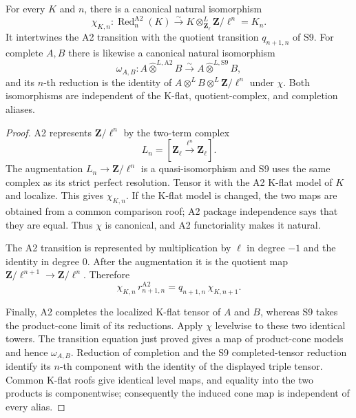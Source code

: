 \begin{lemma}
\label{lemma:weil-pbc-a2-reduction-tensor-transport}
For every $K$ and $n$, there is a canonical natural isomorphism
\[
 \chi_{K,n}:\operatorname{Red}^{\mathrm{A2}}_n(K)
 \xrightarrow{\sim}K\otimes^L_{\mathbf Z_\ell}\mathbf Z/\ell^n=K_n.
\]
It intertwines the A2 transition with the quotient transition
$q_{n+1,n}$ of S9.  For complete $A,B$ there is likewise a canonical natural
isomorphism
\[
 \omega_{A,B}:
 A\widehat\otimes^{L,\mathrm{A2}}B
 \xrightarrow{\sim}
 A\widehat\otimes^{L,\mathrm{S9}}B,
\]
and its $n$-th reduction is the identity of
$A\otimes^LB\otimes^L\mathbf Z/\ell^n$ under $\chi$.  Both isomorphisms are
independent of the K-flat, quotient-complex, and completion aliases.
\end{lemma}
\begin{proof}

A2 represents $\mathbf Z/\ell^n$ by the two-term complex
\[
 L_n=[\mathbf Z_\ell\xrightarrow{\ell^n}\mathbf Z_\ell].
\]
The augmentation $L_n\to\mathbf Z/\ell^n$ is a quasi-isomorphism and S9 uses
the same complex as its strict perfect resolution.  Tensor it with the A2
K-flat model of $K$ and localize.  This gives $\chi_{K,n}$.  If the K-flat
model is changed, the two maps are obtained from a common comparison roof;
A2 package independence says that they are equal.  Thus $\chi$ is canonical,
and A2 functoriality makes it natural.

The A2 transition is represented by multiplication by $\ell$ in degree
$-1$ and the identity in degree $0$.  After the augmentation it is the
quotient map
$\mathbf Z/\ell^{n+1}\to\mathbf Z/\ell^n$.  Therefore
\[
 \chi_{K,n}\,r^{\mathrm{A2}}_{n+1,n}
 =q_{n+1,n}\,\chi_{K,n+1}.
\]

Finally, A2 completes the localized K-flat tensor of $A$ and $B$, whereas S9
takes the product-cone limit of its reductions.  Apply $\chi$ levelwise to
these two identical towers.  The transition equation just proved gives a
map of product-cone models and hence $\omega_{A,B}$.  Reduction of completion
and the S9 completed-tensor reduction identify its $n$-th component with the
identity of the displayed triple tensor.  Common K-flat roofs give identical
level maps, and equality into the two products is componentwise; consequently
the induced cone map is independent of every alias.
\end{proof}

